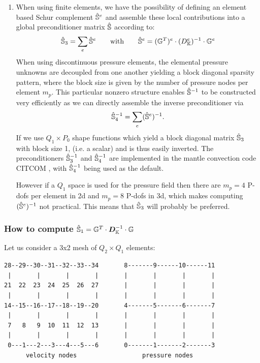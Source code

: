 \begin{enumerate}
\item When using finite elements, we have the possibility of defining
an element based Schur complement $\hat{{\mathbb{S}}}^e$ and assemble these local
contributions into a global preconditioner matrix $\hat{{\mathbb{S}}}$ according to:
\[
\hat{{\mathbb{S}}}_3=\sum_e \hat{{\mathbb{S}}}^e
\qquad \text{with}
\qquad 
\hat{{\mathbb{S}}}^e = ({\mathbb{G}}^T)^e \cdot (D_{\mathbb{K}}^e)^{-1} \cdot {\mathbb{G}}^e
\]
When using discontinuous pressure elements, the elemental
pressure unknowns are decoupled from one another yielding a
block diagonal sparsity pattern, where the block size is given by
the number of pressure nodes per element $m_p$. This particular nonzero 
structure enables $\hat{{\mathbb{S}}}^{-1}$ to be constructed very efficiently as we
can directly assemble the inverse preconditioner via
\[
\hat{{\mathbb{S}}}_4^{-1} = \sum_e (\hat{{\mathbb{S}}}^e)^{-1}.
\]
If we use $Q_1\times P_0$ shape functions which yield a block diagonal matrix
$\hat{{\mathbb{S}}}_3$ with block size 1, (i.e. a scalar) and is thus easily inverted. The
preconditioners $\hat{{\mathbb{S}}}_3^{-1}$ and $\hat{{\mathbb{S}}}_4^{-1}$ are implemented in the 
mantle convection code CITCOM \cite{moso95}, with $\hat{{\mathbb{S}}}_4^{-1}$ being used as the default. 

However if a $Q_1$ space is used for the pressure field then there are $m_p=4$ P-dofs 
per element in 2d and $m_p=8$ P-dofs in 3d, which makes computing $(\hat{{\mathbb{S}}}^e)^{-1}$
not practical. This means that $\hat{{\mathbb{S}}}_3$ will probably be preferred.
\end{enumerate}



\subsubsection{How to compute $\hat{{\mathbb{S}}}_1={\mathbb{G}}^T \cdot {\bm D}_{\mathbb{K}}^{-1} \cdot {\mathbb{G}}$}


Let us consider a 3x2 mesh of $Q_2\times Q_1$ elements:
\begin{verbatim}
28--29--30--31--32--33--34       8-------9------10------11
 |       |       |       |       |       |       |       |
21  22  23  24  25  26  27       |       |       |       |
 |       |       |       |       |       |       |       |
14--15--16--17--18--19--20       4-------5-------6-------7
 |       |       |       |       |       |       |       |
 7   8   9  10  11  12  13       |       |       |       |
 |       |       |       |       |       |       |       |
 0---1---2---3---4---5---6       0-------1-------2-------3
      velocity nodes                  pressure nodes
\end{verbatim}

